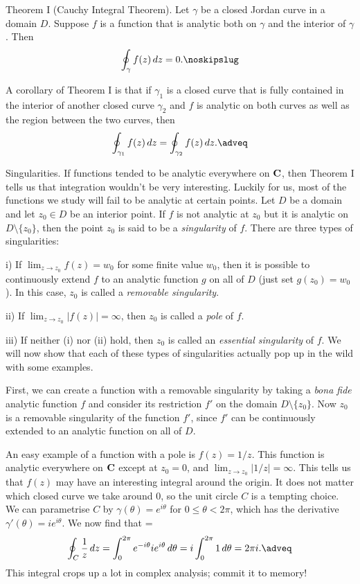 \parenproclaim Theorem I (Cauchy Integral Theorem). Let $\gamma$ be a closed Jordan curve in a domain
$D$. Suppose $f$ is a function that is analytic both on $\gamma$ and the interior of $\gamma$. Then
$$\oint_\gamma f(z)\d z = 0.\noskipslug$$

A corollary of Theorem I is that if $\gamma_1$ is a closed curve that is fully contained in the interior
of another closed curve $\gamma_2$ and $f$ is analytic on both curves as well as the region between
the two curves, then
$$\oint_{\gamma_1} f(z)\d z = \oint_{\gamma_2} f(z)\d z.\adveq$$
\medskip

\boldlabel Singularities. If functions tended to be analytic everywhere on ${\bf C}$, then Theorem I tells
us that integration wouldn't be very interesting. Luckily for us, most of the functions we study
will fail to be analytic at certain points. Let $D$ be a domain and let $z_0\in D$ be an interior point.
If $f$ is not analytic at $z_0$ but it is analytic on $D\setminus \{z_0\}$, then the point $z_0$ is said
to be a {\it singularity} of $f$. There are three types of singularities:
\medskip
\item{i)} If $\lim_{z\to z_0} f(z) = w_0$ for some finite value $w_0$, then
it is possible to continuously extend $f$ to an analytic function $g$ on all of $D$
(just set $g(z_0) = w_0$). In this case, $z_0$ is called a {\it removable singularity}.
\smallskip
\item{ii)} If $\lim_{z\to z_0} |f(z)| = \infty$, then $z_0$ is called a {\it pole} of $f$.
\smallskip
\item{iii)} If neither (i) nor (ii) hold, then $z_0$ is called an {\it essential singularity} of $f$.
\medskip
We will now show that each of these types of singularities actually pop up in the wild with some examples.

First, we can create a function with a removable singularity by taking a {\it bona fide} analytic function $f$
and consider its restriction $f'$ on the domain $D\setminus \{z_0\}$. Now $z_0$ is a removable singularity
of the function $f'$, since $f'$ can be continuously extended to an analytic function on all of $D$.

An easy example of a function with a pole is $f(z) = 1/z$. This function is analytic everywhere on ${\bf C}$ except at
$z_0 = 0$, and $\lim_{z\to z_0} |1/z| = \infty$. This tells us that $f(z)$ may have an interesting integral
around the origin. It does not matter which closed curve we take around 0, so the unit circle $C$ is a tempting
choice. We can parametrise $C$ by $\gamma(\theta) = e^{i\theta}$ for $0\leq \theta< 2\pi$, which has the
derivative $\gamma'(\theta) = ie^{i\theta}$. We now find that
\newcount\twopii
\twopii=\eqcount
$$\oint_C {1\over z}\d z = \int_0^{2\pi} e^{-i\theta} ie^{i\theta} \d\theta= i\int_0^{2\pi} 1\d\theta = 2\pi i.\adveq$$
This integral crops up a lot in complex analysis; commit it to memory!

